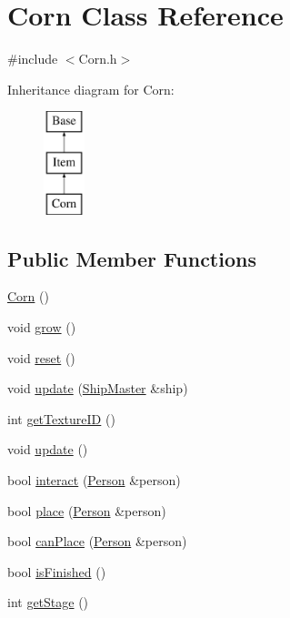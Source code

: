 \hypertarget{classCorn}{\section{Corn Class Reference}
\label{classCorn}
}


{\ttfamily \#include $<$Corn.\-h$>$}

Inheritance diagram for Corn\-:\begin{figure}[H]
\begin{center}
\leavevmode
\includegraphics[height=3.000000cm]{classCorn}
\end{center}
\end{figure}
\subsection*{Public Member Functions}
\begin{DoxyCompactItemize}
\item 
\hyperlink{classCorn_a6857f6bbbd53d8eb29a5f7b0a4b438b9}{Corn} ()
\item 
void \hyperlink{classCorn_aa7e9de2a19263681f7a3248ba821321f}{grow} ()
\item 
void \hyperlink{classCorn_a7fdd2972e5d706de8cf64bd6c2eae2a3}{reset} ()
\item 
void \hyperlink{classCorn_ab9eee4022f2efe2142e987c3bed88a43}{update} (\hyperlink{classShipMaster}{Ship\-Master} \&ship)
\item 
int \hyperlink{classCorn_ac0b6aa014ed83b6c488cf8e77b0f7822}{get\-Texture\-I\-D} ()
\item 
void \hyperlink{classCorn_a6113c52b8a1c3d3e49a5a9908b4375a1}{update} ()
\item 
bool \hyperlink{classCorn_aa3aef7eecbd7cb36a85cdb7d5acd9f28}{interact} (\hyperlink{classPerson}{Person} \&person)
\item 
bool \hyperlink{classCorn_a4554f0e4db0d59d303749c76310d4476}{place} (\hyperlink{classPerson}{Person} \&person)
\item 
bool \hyperlink{classCorn_a120e5ee8556cff62e32ad81456a8809f}{can\-Place} (\hyperlink{classPerson}{Person} \&person)
\item 
bool \hyperlink{classCorn_a717e3de78f91990dce16c33743d9c38f}{is\-Finished} ()
\item 
int \hyperlink{classCorn_a77a736dbaaefb04a913ce461a46b4d0c}{get\-Stage} ()
\end{DoxyCompactItemize}

